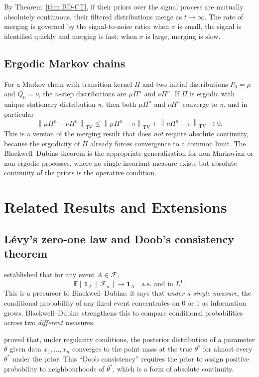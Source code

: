 \documentclass[12pt]{article}
\newcommand{\Ec}[2]{\mathbb{E}\!\left[\,#1\,\middle|\,#2\,\right]}
\newcommand{\TV}[1]{\left\|#1\right\|_{\mathrm{TV}}}
\begin{document}
By Theorem~\ref{thm:BD-CT}, if their priors over the signal process are
mutually absolutely continuous, their filtered distributions merge as
$t \to \infty$.  The rate of merging is governed by the signal-to-noise
ratio: when $\sigma$ is small, the signal is identified quickly and merging
is fast; when $\sigma$ is large, merging is slow.

\subsection{Ergodic Markov chains}

For a Markov chain with transition kernel $\Pi$ and two initial distributions
$P_0 = \mu$ and $Q_0 = \nu$, the $n$-step distributions are $\mu \Pi^n$ and
$\nu \Pi^n$.  If $\Pi$ is ergodic with unique stationary distribution $\pi$,
then both $\mu \Pi^n$ and $\nu \Pi^n$ converge to $\pi$, and in particular
\[
\TV{\mu\Pi^n - \nu\Pi^n} \leq \TV{\mu\Pi^n - \pi} + \TV{\nu\Pi^n - \pi} \to 0.
\]
This is a version of the merging result that does \emph{not} require absolute
continuity, because the ergodicity of $\Pi$ already forces convergence to a
common limit.  The Blackwell--Dubins theorem is the appropriate generalisation
for non-Markovian or non-ergodic processes, where no single invariant measure
exists but absolute continuity of the priors is the operative condition.

\section{Related Results and Extensions}
\label{sec:related}

\subsection{Lévy's zero-one law and Doob's consistency theorem}

\citet{levy1937} established that for any event $A \in \mathscr{F}$,
\[
\Ec{\mathbf{1}_A}{\mathscr{F}_n} \to \mathbf{1}_A \quad \text{a.s.\ and in } L^1.
\]
This is a precursor to Blackwell--Dubins: it says that \emph{under a single
measure}, the conditional probability of any fixed event concentrates on 0
or 1 as information grows.  Blackwell--Dubins strengthens this to compare
conditional probabilities across two \emph{different} measures.

\citet{doob1949} proved that, under regularity conditions, the posterior
distribution of a parameter $\theta$ given data $x_1, \ldots, x_n$ converges
to the point mass at the true $\theta^*$ for almost every $\theta^*$ under
the prior.  This ``Doob consistency'' requires the prior to assign positive
probability to neighbourhoods of $\theta^*$, which is a form of absolute
continuity.
\end{document}

